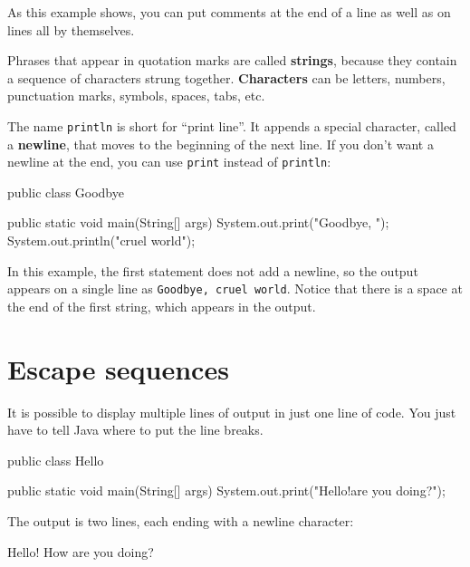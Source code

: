 \documentclass[12pt]{book}
\theoremstyle{exercise}
\newcommand{\java}[1]{\verb"#1"}
\begin{document}
As this example shows, you can put comments at the end of a line as well as on lines all by themselves.


Phrases that appear in quotation marks are called {\bf strings}, because they contain a sequence of characters strung together.
{\bf Characters} can be letters, numbers, punctuation marks, symbols, spaces, tabs, etc.


The name \java{println} is short for ``print line''.
It appends a special character, called a {\bf newline}, that moves to the beginning of the next line.
If you don't want a newline at the end, you can use \java{print} instead of \java{println}:

\begin{code}
public class Goodbye {

    public static void main(String[] args) {
        System.out.print("Goodbye, ");
        System.out.println("cruel world");
    }
}
\end{code}

\label{goodbye}

In this example, the first statement does not add a newline, so the output appears on a single line as {\tt Goodbye, cruel world}.
Notice that there is a space at the end of the first string, which appears in the output.


\section{Escape sequences}

It is possible to display multiple lines of output in just one line of code.
You just have to tell Java where to put the line breaks.

\begin{code}
public class Hello {

    public static void main(String[] args) {
        System.out.print("Hello!\nHow are you doing?\n");
    }
}
\end{code}

The output is two lines, each ending with a newline character:

\begin{stdout}
Hello!
How are you doing?
\end{stdout}

\end{document}
